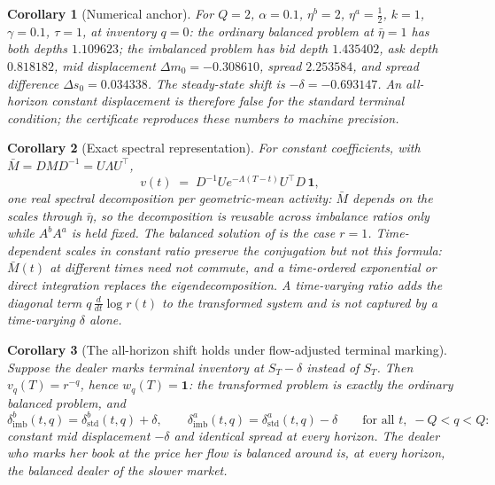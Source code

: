 \documentclass[11pt]{article}
\newtheorem{corollary}{Corollary}
\begin{document}
\begin{corollary}[Numerical anchor]\label{cor:counter}
For $Q=2$, $\alpha = 0.1$, $\eta^b = 2$, $\eta^a = \tfrac12$, $k=1$, $\gamma = 0.1$, $\tau = 1$, at inventory $q = 0$: the ordinary balanced problem at $\bar\eta = 1$ has both depths $1.109623$; the imbalanced problem has bid depth $1.435402$, ask depth $0.818182$, mid displacement $\Delta m_0 = -0.308610$, spread $2.253584$, and spread difference $\Delta s_0 = 0.034338$. The steady-state shift is $-\delta = -0.693147$. An all-horizon constant displacement is therefore false for the standard terminal condition; the certificate reproduces these numbers to machine precision.
\end{corollary}

\begin{corollary}[Exact spectral representation]\label{cor:closed}
For constant coefficients, with $\bar M = D M D^{-1} = U \Lambda U^\top$,
\[
v(t) \;=\; D^{-1} U e^{-\Lambda (T-t)} U^\top D\, \mathbf{1},
\]
one real spectral decomposition per geometric-mean activity: $\bar M$ depends on the scales through $\bar\eta$, so the decomposition is reusable across imbalance ratios only while $A^b A^a$ is held fixed. The balanced solution of \citet{glft2012} is the case $r=1$. Time-dependent scales in constant ratio preserve the conjugation but not this formula: $\bar M(t)$ at different times need not commute, and a time-ordered exponential or direct integration replaces the eigendecomposition. A time-varying ratio adds the diagonal term $q\, \tfrac{d}{dt}\log r(t)$ to the transformed system and is not captured by a time-varying $\delta$ alone.
\end{corollary}

\begin{corollary}[The all-horizon shift holds under flow-adjusted terminal marking]\label{cor:salvage}
Suppose the dealer marks terminal inventory at $S_T - \delta$ instead of $S_T$. Then $v_q(T) = r^{-q}$, hence $w_q(T) = \mathbf{1}$: the transformed problem is exactly the ordinary balanced problem, and
\[
\delta^b_{\mathrm{imb}}(t,q) = \delta^b_{\mathrm{std}}(t,q) + \delta,
\qquad
\delta^a_{\mathrm{imb}}(t,q) = \delta^a_{\mathrm{std}}(t,q) - \delta
\qquad \text{for all } t, \; -Q < q < Q:
\]
constant mid displacement $-\delta$ and identical spread at every horizon. The dealer who marks her book at the price her flow is balanced around is, at every horizon, the balanced dealer of the slower market.
\end{corollary}
\end{document}
